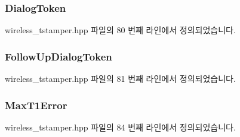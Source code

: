 \subsubsection[{\texorpdfstring{Dialog\+Token}{DialogToken}}]{ Dialog\+Token}\hypertarget{struct___t_i_m_i_n_g_m_s_m_t___r_e_q_u_e_s_t_a27489d6ca946bf7052c24d316f2e76e9}{}\label{struct___t_i_m_i_n_g_m_s_m_t___r_e_q_u_e_s_t_a27489d6ca946bf7052c24d316f2e76e9}


wireless\+\_\+tstamper.\+hpp 파일의 80 번째 라인에서 정의되었습니다.

\subsubsection[{\texorpdfstring{Follow\+Up\+Dialog\+Token}{FollowUpDialogToken}}]{ Follow\+Up\+Dialog\+Token}\hypertarget{struct___t_i_m_i_n_g_m_s_m_t___r_e_q_u_e_s_t_a12f700635d1e47a953c199f6f7a54cab}{}\label{struct___t_i_m_i_n_g_m_s_m_t___r_e_q_u_e_s_t_a12f700635d1e47a953c199f6f7a54cab}


wireless\+\_\+tstamper.\+hpp 파일의 81 번째 라인에서 정의되었습니다.

\subsubsection[{\texorpdfstring{Max\+T1\+Error}{MaxT1Error}}]{ Max\+T1\+Error}\hypertarget{struct___t_i_m_i_n_g_m_s_m_t___r_e_q_u_e_s_t_a15be36379a054c172f725d3ca8cb67e0}{}\label{struct___t_i_m_i_n_g_m_s_m_t___r_e_q_u_e_s_t_a15be36379a054c172f725d3ca8cb67e0}


wireless\+\_\+tstamper.\+hpp 파일의 84 번째 라인에서 정의되었습니다.

